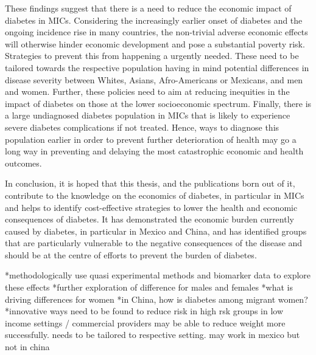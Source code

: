 These findings suggest that there is a need to reduce the economic impact of diabetes in \acp{MIC}. Considering the increasingly earlier onset of diabetes and the ongoing incidence rise in many countries, the non-trivial adverse economic effects will otherwise hinder economic development and pose a substantial poverty risk. Strategies to prevent this from happening a urgently needed. These need to be tailored towards the respective population having in mind potential differences in disease severity between Whites, Asians, Afro-Americans or Mexicans, and men and women. Further, these policies need to aim at reducing inequities in the impact of diabetes on those at the lower socioeconomic spectrum. Finally, there is a large undiagnosed diabetes population in \acp{MIC} that is likely to experience severe diabetes complications if not treated. Hence, ways to diagnose this population earlier in order to prevent further deterioration of health may go a long way in preventing and delaying the most catastrophic economic and health outcomes.

In conclusion, it is hoped that this thesis, and the publications born out of it, contribute to the knowledge on the economics of diabetes, in particular in \acp{MIC} and helps to identify cost-effective strategies to lower the health and economic consequences of diabetes. It has demonstrated the economic burden currently caused by diabetes, in particular in Mexico and China, and has identified groups that are particularly vulnerable to the negative consequences of the disease and should be at the centre of efforts to prevent the burden of diabetes. 






*methodologically use quasi experimental methods and biomarker data to explore these effects 
*further exploration of difference for males and females
*what is driving differences for women
*in China, how is diabetes among migrant women?
*innovative ways need to be found to reduce risk in high rsk groups in low income settings / commercial providers may be able to reduce weight more successfully. needs to be tailored to respective setting. may work in mexico but not in china














